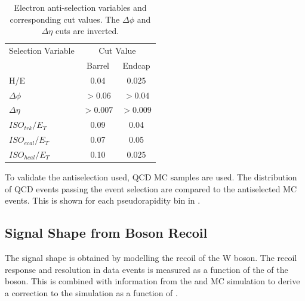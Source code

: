 \begin{table}[htbp]
  \begin{center}
    \leavevmode
    \begin{tabular}{lcc} 
    \toprule
      Selection Variable & \multicolumn{2}{c}{Cut Value}\\
                         & Barrel & Endcap\\
    \midrule
        H/E & 0.04 & 0.025 \\
        $\Delta\phi$ & $>0.06$  & $>0.04$ \\
        $\Delta\eta$ & $>0.007$ & $>0.009$\\
        $ISO_{trk} / E_T $ & 0.09 & 0.04 \\
        $ISO_{ecal}/ E_T$  & 0.07 & 0.05 \\
        $ISO_{hcal}/ E_T$  & 0.10 & 0.025\\ 
    \bottomrule
    \end{tabular}
    \caption{\label{tab:antisel}Electron anti-selection variables and
corresponding cut values. The $\Delta\phi$ and $\Delta\eta$ cuts are inverted.}
  \end{center}
\end{table}

To validate the antiselection used, \ac{QCD} \ac{MC} samples are used. The
distribution of \ac{QCD} events passing the event selection are compared to the
antiselected MC events. This is shown for each pseudorapidity bin in
.

\subsection{Signal \ETm Shape from Boson Recoil}
\label{sec:recoil}
The signal \ETm shape is obtained by modelling the recoil of the W boson. 
The recoil response and resolution in \HepProcess{\PZ\to\Plepton\Plepton} data
events is measured as a function of the \pT of the boson. This is combined with
information from the \PW and \PZ \ac{MC} simulation to derive a correction to
the simulation \ETm as a function of \PW \pT.


